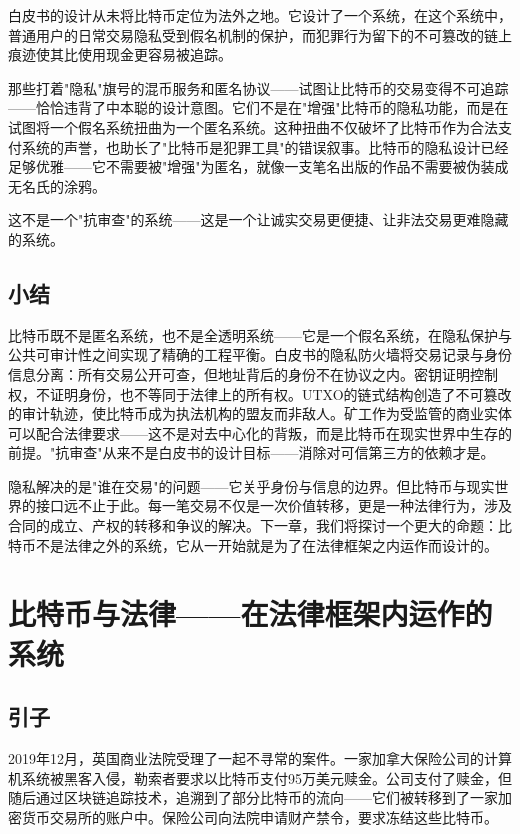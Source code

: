 \documentclass[a4paper,12pt,openany]{ctexbook}
\begin{document}
白皮书的设计从未将比特币定位为法外之地。它设计了一个系统，在这个系统中，普通用户的日常交易隐私受到假名机制的保护，而犯罪行为留下的不可篡改的链上痕迹使其比使用现金更容易被追踪。

那些打着"隐私"旗号的混币服务和匿名协议——试图让比特币的交易变得不可追踪——恰恰违背了中本聪的设计意图。它们不是在"增强"比特币的隐私功能，而是在试图将一个假名系统扭曲为一个匿名系统。这种扭曲不仅破坏了比特币作为合法支付系统的声誉，也助长了"比特币是犯罪工具"的错误叙事。比特币的隐私设计已经足够优雅——它不需要被"增强"为匿名，就像一支笔名出版的作品不需要被伪装成无名氏的涂鸦。

这不是一个"抗审查"的系统——这是一个让诚实交易更便捷、让非法交易更难隐藏的系统。


\section*{小结}


比特币既不是匿名系统，也不是全透明系统——它是一个假名系统，在隐私保护与公共可审计性之间实现了精确的工程平衡。白皮书的隐私防火墙将交易记录与身份信息分离：所有交易公开可查，但地址背后的身份不在协议之内。密钥证明控制权，不证明身份，也不等同于法律上的所有权。UTXO的链式结构创造了不可篡改的审计轨迹，使比特币成为执法机构的盟友而非敌人。矿工作为受监管的商业实体可以配合法律要求——这不是对去中心化的背叛，而是比特币在现实世界中生存的前提。"抗审查"从来不是白皮书的设计目标——消除对可信第三方的依赖才是。

隐私解决的是"谁在交易"的问题——它关乎身份与信息的边界。但比特币与现实世界的接口远不止于此。每一笔交易不仅是一次价值转移，更是一种法律行为，涉及合同的成立、产权的转移和争议的解决。下一章，我们将探讨一个更大的命题：比特币不是法律之外的系统，它从一开始就是为了在法律框架之内运作而设计的。



\chapter{比特币与法律——在法律框架内运作的系统}



\section*{引子}


2019年12月，英国商业法院受理了一起不寻常的案件。一家加拿大保险公司的计算机系统被黑客入侵，勒索者要求以比特币支付95万美元赎金。公司支付了赎金，但随后通过区块链追踪技术，追溯到了部分比特币的流向——它们被转移到了一家加密货币交易所的账户中。保险公司向法院申请财产禁令，要求冻结这些比特币。
\end{document}
